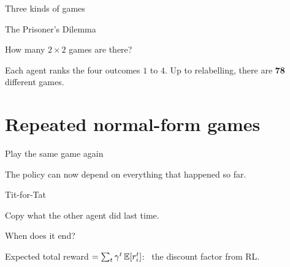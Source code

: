 \documentclass[aspectratio=169,11pt]{beamer}
\begin{document}
\begin{frame}{Three kinds of games}
  \centering
  \vfill
  
  \vfill
  \par{}
\end{frame}

\begin{frame}{The Prisoner's Dilemma}
  \centering
  \vfill
  
  \vfill
  \par{}
\end{frame}

\begin{frame}{How many $2 \times 2$ games are there?}
  \centering
  \vfill
  
  \vfill
  {\small Each agent ranks the four outcomes $1$ to $4$. Up to relabelling, there are \textbf{78} different games.}
  \par{}
\end{frame}

\section{Repeated normal-form games}

\begin{frame}{Play the same game again}
  \centering
  \vfill
  
  \vfill
  {\small The policy can now depend on everything that happened so far.}
  \par{}
\end{frame}

\begin{frame}{Tit-for-Tat}
  \centering
  \vfill
  
  \vfill
  {\small Copy what the other agent did last time.}
  \par{}
\end{frame}

\begin{frame}{When does it end?}
  \centering
  \vfill
  
  \vfill
  {\small Expected total reward $= \sum_{t} \gamma^t\, \mathbb{E}[r_i^t]$: \ the discount factor from RL.}
  \par{}
\end{frame}
\end{document}
